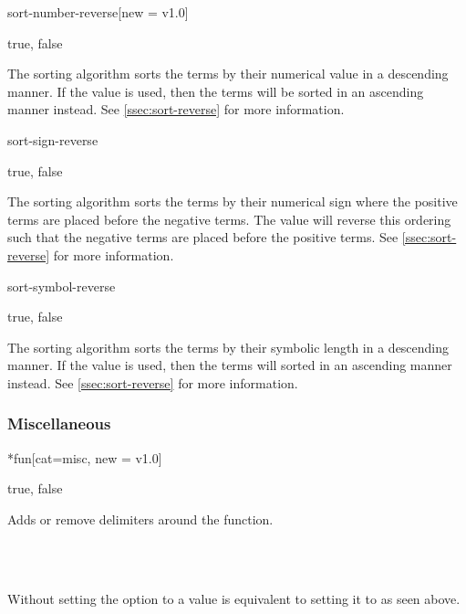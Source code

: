 	\begin{option}{sort-number-reverse}[new = v1.0]
		\begin{values}[default = false]
			true, false
		\end{values}
		The sorting algorithm  sorts the terms by their numerical value in a descending manner. If the value  is used, then the terms will be sorted in an ascending manner instead. See \cref{ssec:sort-reverse} for more information.
	\end{option}
	
	\begin{option}{sort-sign-reverse}
		\begin{values}[default = false]
			true, false
		\end{values}
		The sorting algorithm  sorts the terms by their numerical sign where the positive terms are placed before the negative terms. The value  will reverse this ordering such that the negative terms are placed before the positive terms. See \cref{ssec:sort-reverse} for more information.
	\end{option}
	
	\begin{option}{sort-symbol-reverse}
		\begin{values}[default = false]
			true, false
		\end{values}
		The sorting algorithm  sorts the terms by their symbolic length in a descending manner. If the value  is used, then the terms will sorted in an ascending manner instead. See \cref{ssec:sort-reverse} for more information.
	\end{option}
	
	\subsubsection*{Miscellaneous}
	
	\begin{option}*{fun}[cat=misc, new = v1.0]
		\begin{values}[default = false]
			true, false
		\end{values}
		Adds or remove delimiters around the function.
		\begin{example}
			 \\
			 \\
		\end{example}
		Without setting the option to a value is equivalent to setting it to  as seen above.
	\end{option}
	
